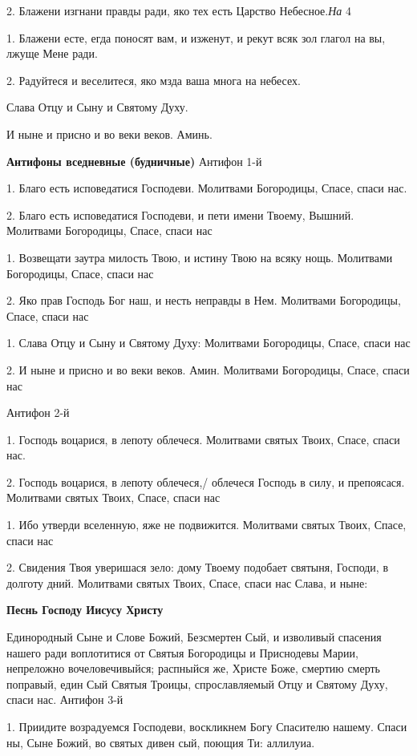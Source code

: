 2. Блажени изгнани правды ради, яко тех есть Царство Небесное.{\itshape  На} 4 

1. Блажени есте, егда поносят вам, и изженут, и рекут всяк зол глагол на вы, лжуще Мене ради. 

2. Радуйтеся и веселитеся, яко мзда ваша многа на небесех. 

Слава Отцу и Сыну и Святому Духу. 

И ныне и присно и во веки веков. Аминь. 

{\bfseries Антифоны вседневные (будничные) }
Антифон 1-й 

1. Благо есть исповедатися Господеви. Молитвами Богородицы, Спасе, спаси нас. 

2. Благо есть исповедатися Господеви, и пети имени Твоему, Вышний. Молитвами Богородицы, Спасе, спаси нас 

1. Возвещати заутра милость Твою, и истину Твою на всяку нощь. Молитвами Богородицы, Спасе, спаси нас 

2. Яко прав Господь Бог наш, и несть неправды в Нем. Молитвами Богородицы, Спасе, спаси нас

1. Слава Отцу и Сыну и Святому Духу: Молитвами Богородицы, Спасе, спаси нас 

2. И ныне и присно и во веки веков. Амин. Молитвами Богородицы, Спасе, спаси нас

Антифон 2-й 

1. Господь воцарися, в лепоту облечеся. Молитвами святых Твоих, Спасе, спаси нас. 

2. Господь воцарися, в лепоту облечеся,/ облечеся Господь в силу, и препоясася. Молитвами святых Твоих, Спасе, спаси нас 

1. Ибо утверди вселенную, яже не подвижится. Молитвами святых Твоих, Спасе, спаси нас 

2. Свидения Твоя уверишася зело: дому Твоему подобает святыня, Господи, в долготу дний. Молитвами святых Твоих, Спасе, спаси нас Слава, и ныне:

{\bfseries  Песнь Господу Иисусу Христу} 

Единородный Сыне и Слове Божий, Безсмертен Сый, и изволивый спасения нашего ради воплотитися от Святыя Богородицы и Приснодевы Марии, непреложно вочеловечивыйся; распныйся же, Христе Боже, смертию смерть поправый, един Сый Святыя Троицы, спрославляемый Отцу и Святому Духу, спаси нас. 
Антифон 3-й 

1. Приидите возрадуемся Господеви, воскликнем Богу Спасителю нашему. Спаси ны, Сыне Божий, во святых дивен сый, поющия Ти: аллилуиа. 


